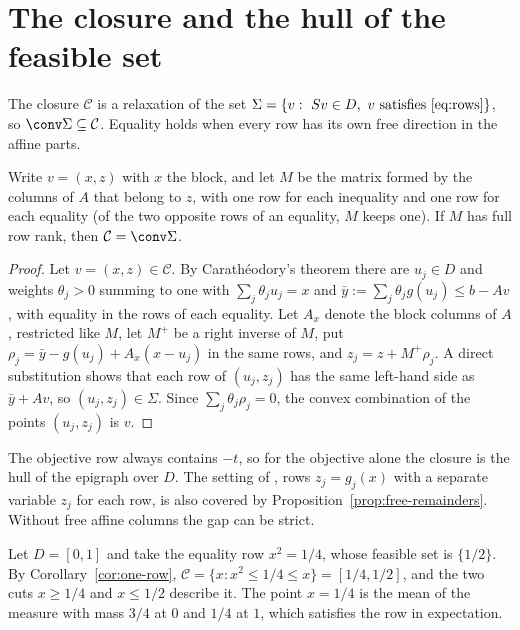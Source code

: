 \section{The closure and the hull of the feasible set}\label{app:feasible-hull}

The closure $\mathcal C$ is a relaxation of the set
$\Sigma=\{v:\ Sv\in D,\ v\text{ satisfies~\eqref{eq:rows}}\}$, so
$\conv\Sigma\subseteq\mathcal C$. Equality holds when every row has its own
free direction in the affine parts.

\begin{proposition}\label{prop:free-remainders}
Write $v=(x,z)$ with $x$ the block, and let $M$ be the matrix formed by the
columns of $A$ that belong to $z$, with one row for each inequality and one
row for each equality (of the two opposite rows of an equality, $M$ keeps one).
If $M$ has full row rank, then $\mathcal C=\conv\Sigma$.
\end{proposition}

\begin{proof}
Let $v=(x,z)\in\mathcal C$. By Carath\'eodory's theorem there are $u_j\in D$ and
weights $\theta_j>0$ summing to one with $\sum_j\theta_ju_j=x$ and
$\bar y:=\sum_j\theta_jg(u_j)\le b-Av$, with equality in the rows of each
equality. Let $A_x$ denote the block columns of $A$, restricted like $M$, let
$M^+$ be a right inverse of $M$, put $\rho_j=\bar y-g(u_j)+A_x(x-u_j)$ in the
same rows, and $z_j=z+M^+\rho_j$. A direct substitution shows that each row
of $(u_j,z_j)$ has the same left-hand side as $\bar y+Av$, so
$(u_j,z_j)\in\Sigma$. Since $\sum_j\theta_j\rho_j=0$, the convex combination of
the points $(u_j,z_j)$ is $v$.
\end{proof}

The objective row always contains $-t$, so for the objective alone the
closure is the hull of the epigraph over $D$. The setting of
\citet{LiersEtAl2021}, rows $z_j=g_j(x)$ with a separate variable $z_j$ for
each row, is also covered by Proposition~\ref{prop:free-remainders}. Without
free affine columns the gap can be strict.

\begin{example}\label{ex:quarter}
Let $D=[0,1]$ and take the equality row $x^2=1/4$, whose feasible set is
$\{1/2\}$. By Corollary~\ref{cor:one-row}, $\mathcal C=\{x:x^2\le1/4\le x\}=[1/4,1/2]$,
and the two cuts $x\ge1/4$ and $x\le1/2$ describe it. The point $x=1/4$ is the
mean of the measure with mass $3/4$ at $0$ and $1/4$ at $1$, which satisfies
the row in expectation.
\end{example}

